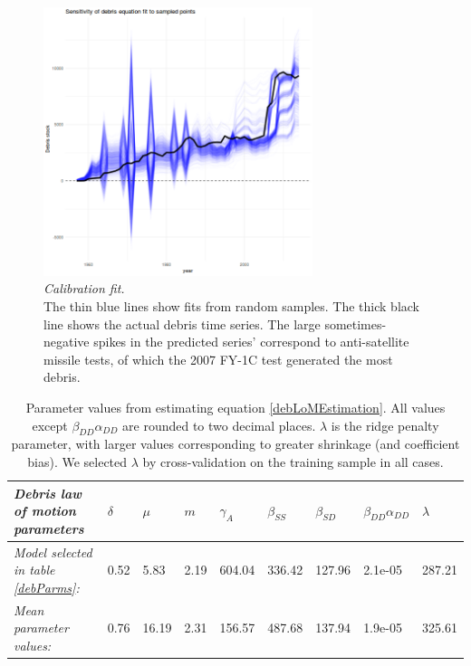 \documentclass[12pt]{article}
\begin{document}
\begin{figure}[H]
	\centering
	\includegraphics[width=0.7\textwidth]{../../images/debris_lom_sensitivity_plot.png}
	\captionsetup{format=hang}
	\caption{\textit{Calibration fit.} \\
		The thin blue lines show fits from random samples. The thick black line shows the actual debris time series. The large sometimes-negative spikes in the predicted series' correspond to anti-satellite missile tests, of which the 2007 FY-1C test generated the most debris.
	}
	\label{debSensitivityFig}
\end{figure}

\begin{table}[H]
	\begin{tabular}{|l|l|l|l|l|l|l|l|l|}
		\hline
		\textit{Debris law of motion parameters} & \textbf{$\delta$} & \textbf{$\mu$} & \textbf{$m$} & \textbf{$\gamma_A$} & \textbf{$\beta_{SS}$} & \textbf{$\beta_{SD}$} & \textbf{$\beta_{DD}\alpha_{DD}$} & $\lambda$ \\ \hline
		\textit{Model selected in table \ref{debParms}:}                           & 0.52              & 5.83           & 2.19         & 604.04              & 336.42                & 127.96                & 2.1e-05  &    287.21                     \\ \hline
		\textit{Mean parameter values:}                           & 0.76              & 16.19           & 2.31         & 156.57              &  487.68                & 137.94                & 1.9e-05      &  325.61                  \\ \hline
	\end{tabular}
	\caption{Parameter values from estimating equation \ref{debLoMEstimation}. All values except $\beta_{DD}\alpha_{DD}$ are rounded to two decimal places. $\lambda$ is the ridge penalty parameter, with larger values corresponding to greater shrinkage (and coefficient bias). We selected $\lambda$ by cross-validation on the training sample in all cases.}
	\label{debSensitivityCoefs}
\end{table}
\end{document}
